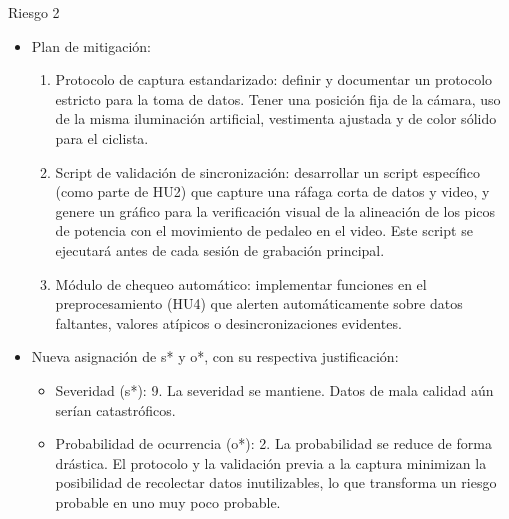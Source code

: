 \documentclass[
11pt, %
]{charter}
\begin{document}
Riesgo 2
\begin{itemize}
    \item Plan de mitigación:
    \begin{enumerate}
        \item Protocolo de captura estandarizado: definir y documentar un protocolo estricto para la toma de datos. Tener una posición fija de la cámara, uso de la misma iluminación artificial, vestimenta ajustada y de color sólido para el ciclista.
        \item Script de validación de sincronización: desarrollar un script específico (como parte de HU2) que capture una ráfaga corta de datos y video, y genere un gráfico para la verificación visual de la alineación de los picos de potencia con el movimiento de pedaleo en el video. Este script se ejecutará antes de cada sesión de grabación principal.
        \item Módulo de chequeo automático: implementar funciones en el preprocesamiento (HU4) que alerten automáticamente sobre datos faltantes, valores atípicos o desincronizaciones evidentes.
    \end{enumerate}
    \item Nueva asignación de s* y o*, con su respectiva justificación:
    \begin{itemize}
        \item Severidad (s*): 9. La severidad se mantiene. Datos de mala calidad aún serían catastróficos.
        \item Probabilidad de ocurrencia (o*): 2. La probabilidad se reduce de forma drástica. El protocolo y la validación previa a la captura minimizan la posibilidad de recolectar datos inutilizables, lo que transforma un riesgo probable en uno muy poco probable.
    \end{itemize}
\end{itemize}
\end{document}
